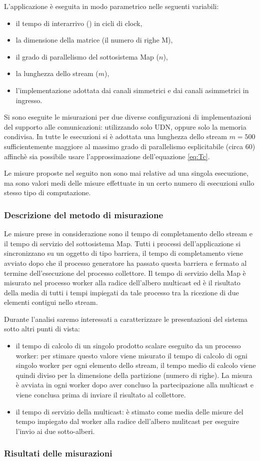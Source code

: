 L'applicazione \`e eseguita in modo parametrico nelle seguenti variabili:
\begin{itemize}
\item il tempo di interarrivo (\Ta) in cicli di clock,
\item la dimensione della matrice (il numero di righe M),
\item il grado di parallelismo del sottosistema Map ($n$),
\item la lunghezza dello stream ($m$), 
\item l'implementazione adottata dai canali simmetrici e dai canali asimmetrici in ingresso.
\end{itemize}
Si sono eseguite le misurazioni per due diverse configurazioni di implementazioni del supporto alle comunicazioni: utilizzando solo UDN, oppure solo la memoria condivisa. In tutte le esecuzioni si \`e adottata una lunghezza dello stream $m = 500$ sufficientemente maggiore al massimo grado di parallelismo esplicitabile (circa 60) affinch\`e sia possibile usare l'approssimazione dell'equazione \ref{eq:Tc}.

Le misure proposte nel seguito non sono mai relative ad una singola esecuzione, ma sono valori medi delle misure effettuate in un certo numero di esecuzioni sullo stesso tipo di computazione.

\subsubsection{Descrizione del metodo di misurazione}
Le misure prese in considerazione sono il tempo di completamento dello stream e il tempo di servizio del sottosistema Map. Tutti i processi dell'applicazione si sincronizzano su un oggetto di tipo barriera, il tempo di completamento viene avviato dopo che il processo generatore ha passato questa barriera e fermato al termine dell'esecuzione del processo collettore. Il tempo di servizio della Map \`e misurato nel processo worker alla radice dell'albero multicast ed \`e il risultato della media di tutti i tempi impiegati da tale processo tra la ricezione di due elementi contigui nello stream. 

Durante l'analisi saremo interessati a caratterizzare le presentazioni del sistema sotto altri punti di vista:
\begin{itemize}
\item il tempo di calcolo di un singolo prodotto scalare eseguito da un processo worker: per stimare questo valore viene misurato il tempo di calcolo di ogni singolo worker per ogni elemento dello stream, il tempo medio di calcolo viene quindi diviso per la dimensione della partizione (numero di righe). La misura \`e avviata in ogni worker dopo aver concluso la partecipazione alla multicast e viene conclusa prima di inviare il risultato al collettore.
\item il tempo di servizio della multicast: \`e stimato come media delle misure del tempo impiegato dal worker alla radice dell'albero mulitcast per eseguire l'invio ai due sotto-alberi.
\end{itemize}

\subsubsection{Risultati delle misurazioni}



